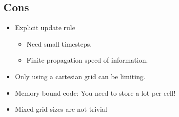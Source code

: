 \subsection{Cons}
\begin{itemize}
    \item Explicit update rule
        \begin{itemize}
            \item Need small timesteps.
            \item Finite propagation speed of information.
        \end{itemize}

    \item Only using a cartesian grid can be limiting.
    \item Memory bound code: You need to store a lot per cell!
	\item Mixed grid sizes are not trivial    

        
        
        

\end{itemize}
